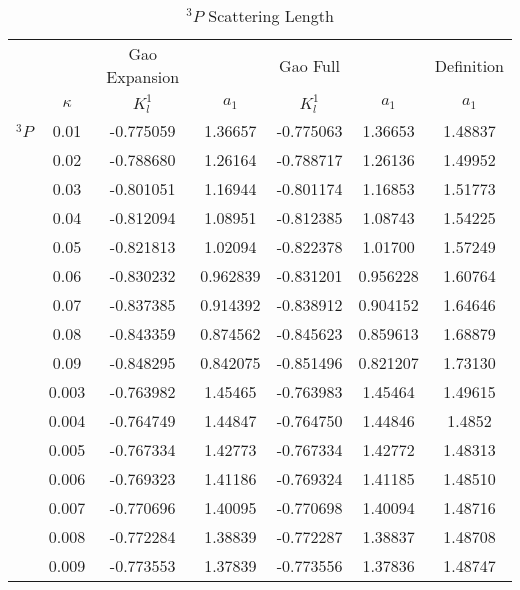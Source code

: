 \documentclass[Dissertation.tex]{subfiles}
\begin{document}
\begin{table}[H]
	\centering
	\normalsize
	\begin{tabular}{c c | c c | c c | c}
	\toprule
			& & Gao Expansion & & Gao Full & & Definition \\
			& $\kappa$ & $K_l^1$ & $a_1$ & $K_l^1$ & $a_1$ & $a_1$ \\
	\midrule
		$^3P$ & 0.01 & -0.775059 & 1.36657 & -0.775063 & 1.36653 & 1.48837\\
			& 0.02 & -0.788680 & 1.26164 & -0.788717 & 1.26136 & 1.49952\\
			& 0.03 & -0.801051 & 1.16944 & -0.801174 & 1.16853 & 1.51773\\
			& 0.04 & -0.812094 & 1.08951 & -0.812385 & 1.08743 & 1.54225\\
			& 0.05 & -0.821813 & 1.02094 & -0.822378 & 1.01700 & 1.57249\\
			& 0.06 & -0.830232 & 0.962839 & -0.831201 & 0.956228 & 1.60764\\
			& 0.07 & -0.837385 & 0.914392 & -0.838912 & 0.904152 & 1.64646\\
			& 0.08 & -0.843359 & 0.874562 & -0.845623 & 0.859613 & 1.68879\\
			& 0.09 & -0.848295 & 0.842075 & -0.851496 & 0.821207 & 1.73130\\
	\midrule
			 & 0.003 & -0.763982 & 1.45465 & -0.763983 & 1.45464 & 1.49615\\
			 & 0.004 & -0.764749 & 1.44847 & -0.764750 & 1.44846 & 1.4852\\
			 & 0.005 & -0.767334 & 1.42773 & -0.767334 & 1.42772 & 1.48313\\
			 & 0.006 & -0.769323 & 1.41186 & -0.769324 & 1.41185 & 1.48510\\
			 & 0.007 & -0.770696 & 1.40095 & -0.770698 & 1.40094 & 1.48716\\
			 & 0.008 & -0.772284 & 1.38839 & -0.772287 & 1.38837 & 1.48708\\
			 & 0.009 & -0.773553 & 1.37839 & -0.773556 & 1.37836 & 1.48747\\
	\bottomrule
	\end{tabular}
	\caption{$^3P$ Scattering Length}
	\label{PWaveScatLen3}
\end{table}
\end{document}

